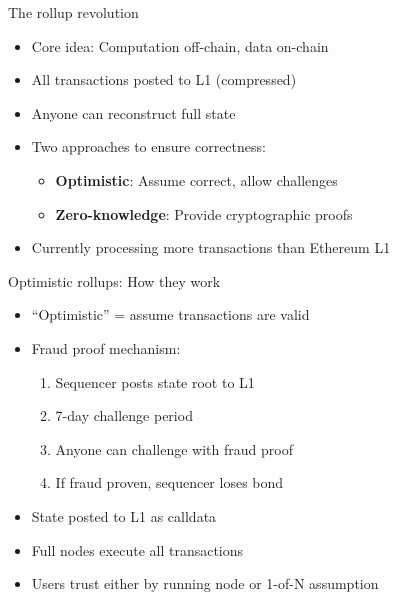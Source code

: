 \documentclass[aspectratio=169, lualatex, handout]{beamer}
\begin{document}
\begin{frame}{The rollup revolution}
	\begin{itemize}
		\item Core idea: Computation off-chain, data on-chain
		\item All transactions posted to L1 (compressed)
		\item Anyone can reconstruct full state
		\item Two approaches to ensure correctness:
		      \begin{itemize}
			      \item \textbf{Optimistic}: Assume correct, allow challenges
			      \item \textbf{Zero-knowledge}: Provide cryptographic proofs
		      \end{itemize}
		\item Currently processing more transactions than Ethereum L1
	\end{itemize}
\end{frame}

\begin{frame}{Optimistic rollups: How they work}
	\begin{itemize}
		\item ``Optimistic'' = assume transactions are valid
		\item Fraud proof mechanism:
		      \begin{enumerate}
			      \item Sequencer posts state root to L1
			      \item 7-day challenge period
			      \item Anyone can challenge with fraud proof
			      \item If fraud proven, sequencer loses bond
		      \end{enumerate}
		\item State posted to L1 as calldata
		\item Full nodes execute all transactions
		\item Users trust either by running node or 1-of-N assumption
	\end{itemize}
\end{frame}
\end{document}
